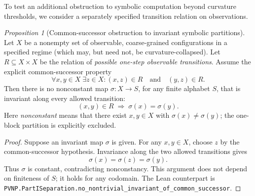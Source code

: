 \documentclass[12pt]{article}
\theoremstyle{remark}
\newtheorem{proposition}[theorem]{Proposition}
\begin{document}
To test an additional obstruction to symbolic computation beyond curvature thresholds, we consider a separately specified transition relation on observations.

\begin{proposition}[Common-successor obstruction to invariant symbolic partitions]
\label{prop:collapse-grammar}
Let $X$ be a nonempty set of observable, coarse-grained configurations in
a specified regime (which may, but need not, be curvature-collapsed).
Let $R\subseteq X\times X$ be the relation of \emph{possible one-step
observable transitions}. Assume the explicit common-successor property
\[
  \forall x,y\in X\;\exists z\in X:
      (x,z)\in R\quad\text{and}\quad(y,z)\in R.
\]
Then there is no nonconstant map $\sigma:X\to S$, for any finite alphabet
$S$, that is invariant along every allowed transition:
\[
  (x,y)\in R\;\Longrightarrow\;\sigma(x)=\sigma(y).
\]
Here \emph{nonconstant} means that there exist $x,y\in X$ with
$\sigma(x)\ne\sigma(y)$; the one-block partition is explicitly excluded.
\end{proposition}

\begin{proof}
Suppose an invariant map $\sigma$ is given. For any $x,y\in X$,
choose $z$ by the common-successor hypothesis. Invariance along the
two allowed transitions gives
\[
  \sigma(x)=\sigma(z)=\sigma(y).
\]
Thus $\sigma$ is constant, contradicting nonconstancy. This argument
does not depend on finiteness of $S$; it holds for any codomain.
The Lean counterpart is
\nolinkurl{PVNP.PartISeparation.no_nontrivial_invariant_of_common_successor}.
\end{proof}
\end{document}
